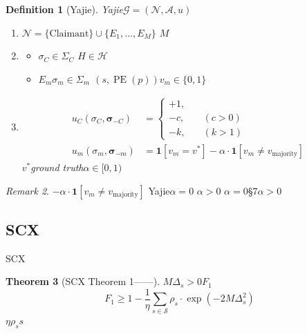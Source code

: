 \documentclass[11pt,a4paper]{article}
\DeclareMathOperator{\PE}{PE}
\newtheorem{theorem}{Theorem}[section]
\newtheorem{definition}[theorem]{Definition}
\theoremstyle{remark}
\newtheorem{remark}[theorem]{Remark}
\newcommand{\Sstates}{\mathcal{S}}
\begin{document}
\begin{definition}[Yajie]
\label{def:yajie_game}
Yajie$\mathcal{G} = (\mathcal{N}, \mathcal{A}, u)$
\begin{enumerate}[label=(\roman*)]
    \item \textbf{} $\mathcal{N} = \{\text{Claimant}\} \cup \{E_1, \ldots, E_M\}$
          \textbf{}$M$\textbf{}
    \item \textbf{}
          \begin{itemize}
              \item $\sigma_C \in \Sigma_C$
                    $H \in \mathcal{H}$
                    
              \item $E_m$$\sigma_m \in \Sigma_m$
                    $(s, \PE(p))$$v_m \in \{0,1\}$
          \end{itemize}
    \item \textbf{}
          \begin{align}
              u_C(\sigma_C, \bm{\sigma}_{-C}) &=
              \begin{cases}
                  +1, & \text{} \\
                  -c, & \text{} \quad (c > 0) \\
                  -k, & \text{} \quad (k > 1)
              \end{cases} \\
              u_m(\sigma_m, \bm{\sigma}_{-m}) &=
              \mathbf{1}[v_m = v^*] - \alpha \cdot \mathbf{1}[v_m \neq v_{\text{majority}}]
          \end{align}
          $v^*$ground truth$\alpha \in [0, 1)$
          
\end{enumerate}
\end{definition}

\begin{remark}
\textbf{}$-\alpha \cdot \mathbf{1}[v_m \neq v_{\text{majority}}]$
Yajie$\alpha = 0$
$\alpha > 0$
$\alpha = 0$\S7$\alpha > 0$
\end{remark}

\subsection{SCX}

SCX

\begin{theorem}[SCX Theorem 1——]
\label{thm:scx1}
$M$$\Delta_s > 0$$F_1$
\begin{equation}
    \boxed{F_1 \geq 1 - \frac{1}{\eta}\sum_{s \in \Sstates} \rho_s \cdot
    \exp\!\left(-2M\Delta_s^2\right)}
\end{equation}
$\eta$$\rho_s$$s$
\end{theorem}
\end{document}
